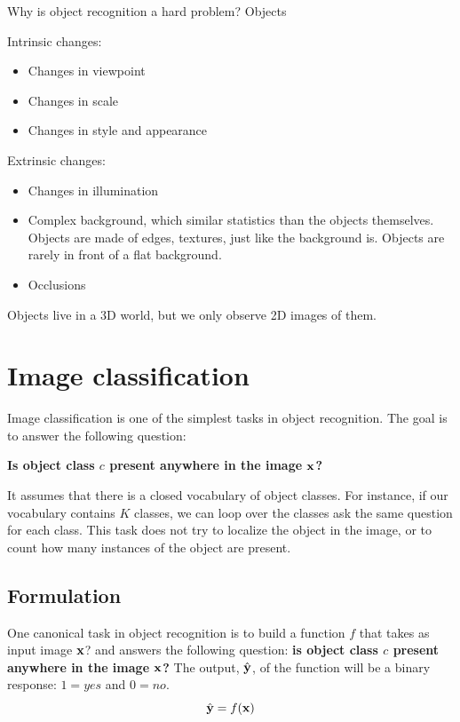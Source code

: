Why is object recognition a hard problem? Objects 

Intrinsic changes:
\begin{itemize}
    \item Changes in viewpoint
    \item Changes in scale
    \item Changes in style and appearance
\end{itemize}

Extrinsic changes:
\begin{itemize}
    \item Changes in illumination
    \item Complex background, which similar statistics than the objects themselves. Objects are made of edges, textures, just like the background is. Objects are rarely in front of a flat background. 
    \item Occlusions
\end{itemize}

Objects live in a 3D world, but we only observe 2D images of them.

\section{Image classification}


Image classification is one of the simplest tasks in object recognition. The goal is to answer the following question:

\centerline{
{\bf Is object class $c$ present anywhere in the image $\bf x$?}
}

It assumes that there is a closed vocabulary of object classes. For instance, if our vocabulary contains $K$ classes, we can loop over the classes ask the same question for each class. This task does not try to localize the object in the image, or to count how many instances of the object are present.
 
\subsection{Formulation}

One canonical task in object recognition is to build a function $f$ that takes as input image $\bf x$? and answers the following question: {\bf is object class $c$ present anywhere in the image $\bf x$?} The output, $\hat {\bf y}$, of the function will be a binary response: $1=yes$ and $0=no$. 
\begin{equation}
\hat {\bf y} = f({\bf x})
\end{equation}


